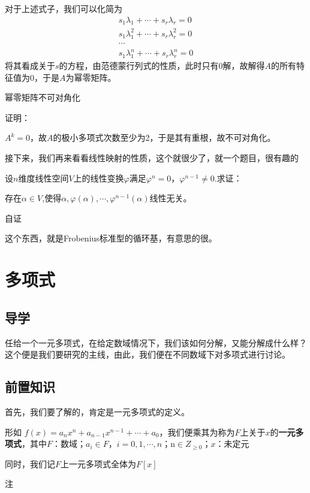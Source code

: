 \documentclass[lang=cn,10pt]{elegantbook}
\begin{document}
对于上述式子，我们可以化简为
\begin{equation*}
	\begin{split}
		s_{1}\lambda_{1}+\cdots+s_{r}\lambda_{r}=0
		\\
		s_{1}\lambda_{1}^{2}+\cdots+s_{r}\lambda_{r}^{2}=0
		\\
		\cdots
		\\
		s_{1}\lambda_{1}^{n}+\cdots+s_{r}\lambda_{r}^{n}=0
	\end{split}
\end{equation*}
将其看成关于$s$的方程，由范德蒙行列式的性质，此时只有0解，故解得$A$的所有特征值为0，于是$A$为幂零矩阵。
\begin{example}
	幂零矩阵不可对角化
\end{example}
证明：

$A^{k}=0$，故$A$的极小多项式次数至少为2，于是其有重根，故不可对角化。

接下来，我们再来看看线性映射的性质，这个就很少了，就一个题目，很有趣的
\begin{example}
	设$n$维度线性空间$V$上的线性变换$\varphi$满足$\varphi^{n}=0$，$\varphi^{n-1}\ne 0$.求证：
	
	存在$\alpha$$\in$$V$,使得$\alpha,\varphi(\alpha),\cdots,\varphi^{n-1}(\alpha)$线性无关。
\end{example}
\begin{solution}
	
	自证
	
\end{solution}
这个东西，就是Frobenius标准型的循环基，有意思的很。
\chapter{多项式}
\section{导学}
任给一个一元多项式，在给定数域情况下，我们该如何分解，又能分解成什么样？这个便是我们要研究的主线，由此，我们便在不同数域下对多项式进行讨论。
\section{前置知识}
首先，我们要了解的，肯定是一元多项式的定义。
\begin{definition}[一元多项式]
	形如
	$f(x)=a_nx^n+a_{n-1}x^{n-1}+\cdots+a_0$，我们便乘其为称为$F$上关于$x$的\textbf{一元多项式}，其中$F$：数域；$a_i\in F$，$i=0,1,\cdots,n$；n$\in Z_{\geq0}$；$x$：未定元
	
	同时，我们记$F$上一元多项式全体为$F[x]$
\end{definition}
注
\end{document}
